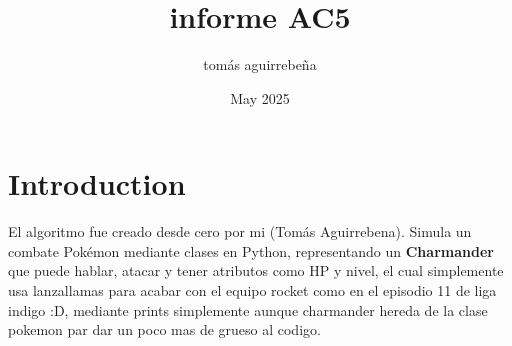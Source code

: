 \documentclass{article}
\title{informe AC5}
\author{tomás aguirrebeña}
\date{May 2025}
\begin{document}
\maketitle

\section{Introduction}
El algoritmo fue creado desde cero por mi (Tomás Aguirrebena). Simula un combate Pokémon mediante clases en Python, representando un \textbf{Charmander} que puede hablar, atacar y tener atributos como HP y nivel, el cual simplemente usa lanzallamas para acabar con el equipo rocket como en el episodio 11 de liga indigo :D, mediante prints simplemente aunque charmander hereda de la clase pokemon par dar un poco mas de grueso al codigo.
\end{document}
